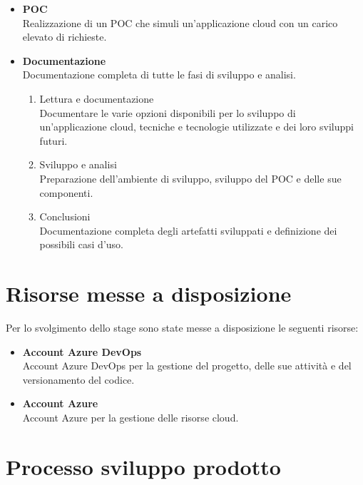\begin{itemize}
    \item \textbf{POC} \\
    Realizzazione di un POC che simuli un'applicazione cloud con un carico elevato di richieste.
    \item \textbf{Documentazione} \\
    Documentazione completa di tutte le fasi di sviluppo e analisi.
    \begin{enumerate}
        \item Lettura e documentazione \\
         Documentare le varie opzioni disponibili per lo sviluppo di un'applicazione cloud, tecniche e tecnologie utilizzate e dei loro sviluppi futuri.
        
        \item Sviluppo e analisi \\
        Preparazione dell'ambiente di sviluppo, sviluppo del POC e delle sue componenti.
    
        
        \item Conclusioni \\
        Documentazione completa degli artefatti sviluppati e definizione dei possibili casi d'uso.
    \end{enumerate}
\end{itemize}



\section{Risorse messe a disposizione}
\label{sec:risorse-messe-a-disposizione}
Per lo svolgimento dello stage sono state messe a disposizione le seguenti risorse:
\begin{itemize}
    \item \textbf{Account Azure DevOps} \\
    Account Azure DevOps per la gestione del progetto, delle sue attività e del versionamento del codice.
    \item \textbf{Account Azure} \\
    Account Azure per la gestione delle risorse cloud.
\end{itemize}

\section{Processo sviluppo prodotto}
